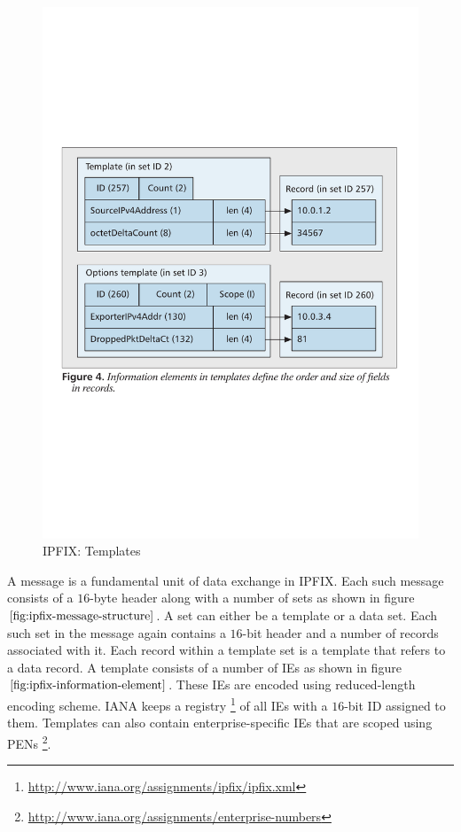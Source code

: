 \begin{figure}[ht]
\begin{minipage}[b]{0.49\linewidth}
		\includegraphics[width=1.0\linewidth]{figures/ipfix-information-element}
		\caption{IPFIX: Templates \cite{btrammell:2011}}
		\label{fig:ipfix-information-element}
	\end{minipage}	
\end{figure}
A message is a fundamental unit of data exchange in \ac{IPFIX}. Each such message consists of a $16$-byte header along with a number of sets as shown in figure $\ref{fig:ipfix-message-structure}$. A set can either be a template or a data set. Each such set in the  message again contains a $16$-bit header and a number of records associated with it. Each record within a template set is a template that refers to a data record.  A template consists of a number of \ac{IE}s as shown in figure $\ref{fig:ipfix-information-element}$. These \ac{IE}s are encoded using reduced-length encoding scheme. \ac{IANA} keeps a registry \footnote{\url{http://www.iana.org/assignments/ipfix/ipfix.xml}} of all \ac{IE}s with a $16$-bit ID assigned to them. Templates can also contain enterprise-specific \ac{IE}s that are scoped using \ac{PENs} \footnote{\url{http://www.iana.org/assignments/enterprise-numbers}}. 

